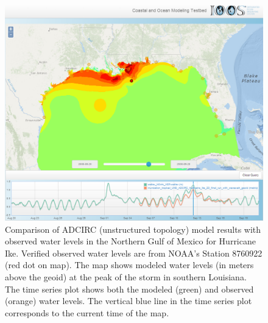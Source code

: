 \begin{figure}[ht!]
  \centering
  \includegraphics[width=0.8\columnwidth]{../figs/SciWMS_ModelObsComparison_crop_373_8_1052_879}
  \caption{Comparison of ADCIRC (unstructured topology) model results
    with observed water levels in the Northern Gulf of Mexico for
    Hurricane Ike. Verified observed water levels are from NOAA's
    Station 8760922 (red dot on map). The map shows modeled water
    levels (in meters above the geoid) at the peak of the storm in
    southern Louisiana. The time series plot shows both the modeled
    (green) and observed (orange) water levels. The vertical blue line
    in the time series plot corresponds to the current time of the
    map.}
  \label{fig:adcirc_comp}
\end{figure}

